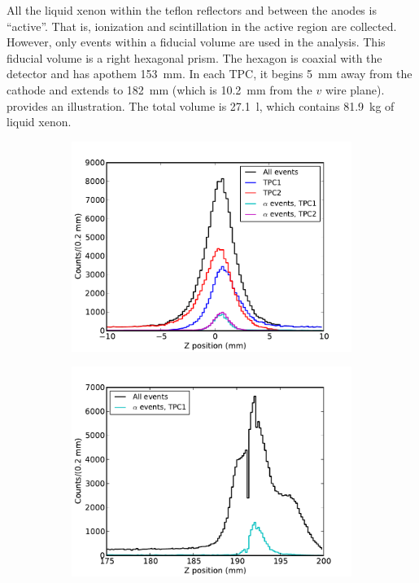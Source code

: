 \documentclass[herrin-thesis.tex]{subfiles}
\begin{document}
All the liquid xenon within the teflon reflectors and between the anodes is ``active''. That is, ionization and scintillation in the active region are collected. However, only events within a fiducial volume are used in the analysis. This fiducial volume is a right hexagonal prism. The hexagon is coaxial with the detector and has apothem \SI{153}{\mm}. In each TPC, it begins \SI{5}{\mm} away from the cathode and extends to \SI{182}{\mm} (which is \SI{10.2}{\mm} from the \(v\) wire plane).  provides an illustration. The total volume is \SI{27.1}{\litre}, which contains \SI{81.9}{\kg} of liquid xenon.

\begin{figure}[htp]
\centering
	\begin{subfigure}[b]{0.48\textwidth}
	\centering
	\includegraphics[width=\textwidth]{./plots/analysis_fiducial_vol_bg_cathode.pdf}
\end{subfigure}\hfill%
\begin{subfigure}[b]{0.48\textwidth}
	\centering
	\includegraphics[width=1\textwidth]{./plots/analysis_fiducial_vol_bg_anode.pdf}

\end{subfigure}
\end{figure}
\end{document}
